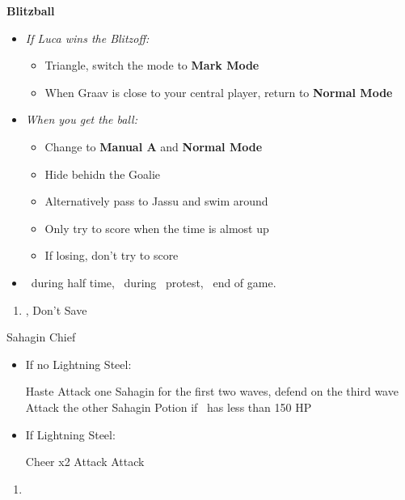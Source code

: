 \begin{trial}
	\textbf{Blitzball}
	\begin{itemize}
		\item \textit{If Luca wins the Blitzoff:}
		\begin{itemize}
			\item Triangle, switch the mode to \textbf{Mark Mode}
			\item When Graav is close to your central player, return to \textbf{Normal Mode}
		\end{itemize}
		\item \textit{When you get the ball:}
		\begin{itemize}
			\item Change to \textbf{Manual A} and \textbf{Normal Mode}
			\item Hide behidn the Goalie
			\item Alternatively pass to Jassu and swim around
			\item Only try to score when the time is almost up
			\item If losing, don't try to score
		\end{itemize}
		\item \sd\ during half time, \sd\ during \wakka\ protest, \sd\ end of game.
	\end{itemize}
\end{trial}
\begin{enumerate}[resume]
	\item \cs[1:00], Don't Save
\end{enumerate}
\begin{battle}{Sahagin Chief}
	\begin{itemize}
		\item{If no Lightning Steel:}
		\begin{itemize}
			\tidusf Haste \tidus
			\wakkaf Attack one Sahagin for the first two waves, defend on the third wave
			\tidusf Attack the other Sahagin
			\wakkaf Potion if \tidus\ has less than 150 HP
		\end{itemize}
		\item{If Lightning Steel:}
		\begin{itemize}
			\tidusf Cheer x2
			\wakkaf Attack
			\tidusf Attack
		\end{itemize}
	\end{itemize}
\end{battle}
\begin{enumerate}[resume]
	\item \sd
\end{enumerate}
